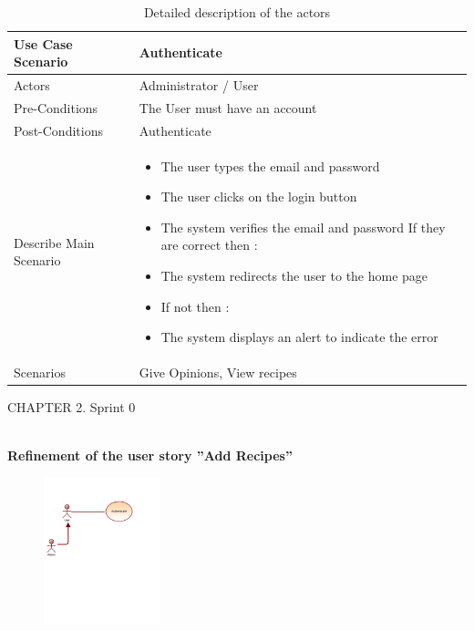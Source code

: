 \documentclass{article}
\begin{document}
{\begin{table}[h]
    \centering
    \begin{tabularx}{\textwidth}{X|X}
        \toprule
        Use Case Scenario & Authenticate \\
        \midrule
        Actors & Administrator / User \\
        \midrule
        Pre-Conditions & The User must have an account \\
        \midrule
        Post-Conditions & Authenticate \\
        \midrule
        Describe Main Scenario &  \begin{itemize}[label=$\bullet$]
            \item The user types the email and password
            \item The user clicks on the login button
            \item The system verifies the email and password If they are correct then :
            \item The system redirects the user to the home page 
            \item If not then :
	  \item The system displays an alert to indicate the error
        \end{itemize} \\
        \midrule
        Scenarios &  Give Opinions, View recipes \\
        \bottomrule
    \end{tabularx}
    \caption{Detailed description of the actors}
    \label{tab:actors_roles}
\end{table}
\newpage
\noindent
CHAPTER 2.  Sprint 0 \\
\underline{\hspace{\textwidth}} \vspace{0.2cm}\\
{\large \textbf{Refinement of the user story ”Add Recipes”}
\begin{figure}[htbp]
    \centering
    \includegraphics[width=0.3\textwidth]{Authenticate}

\end{figure}}}
\end{document}
